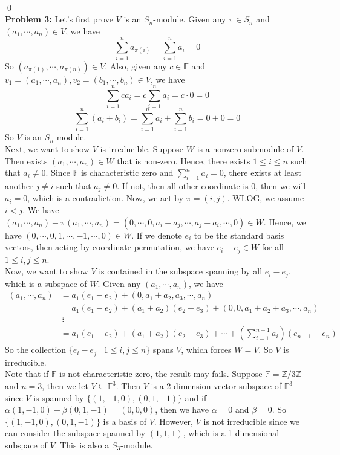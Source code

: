 \documentclass[12pt]{amsart}
\newcommand{\Z}{\mathbb{Z}}
\newcommand{\F}{\mathbb{F}}
\begin{document}
\\\qed\\
\textbf{Problem 3:} Let's first prove $V$ is an $S_n$-module. Given any $\pi\in S_n$ and $(a_1,\cdots, a_n)\in V$, we have 
\[\sum_{i=1}^na_{\pi(i)}=\sum_{i=1}^na_i=0\]
So $(a_{\pi(1)},\cdots, a_{\pi(n)})\in V$. Also, given any $c\in \F$ and $v_1=(a_1,\cdots,a_n),v_2=(b_1,\cdots,b_n)\in V$, we have 
\[\sum_{i=1}^n ca_i=c\sum_{i=1}^na_i=c\cdot 0=0\]
\[\sum_{i=1}^n (a_i+b_i)=\sum_{i=1}^n a_i+\sum_{i=1}^n b_i=0+0=0\]
So $V$ is an $S_n$-module.\\
Next, we want to show $V$ is irreducible. Suppose $W$ is a nonzero submodule of $V$. Then exists $(a_1,\cdots,a_n)\in W$ that is non-zero. Hence, there exists $1\leq i\leq n$ such that $a_i\neq 0$. Since $\F$ is characteristic zero and $\sum_{i=1}^n  a_i=0$, there exists at least another $j\neq i$ such that $a_j\neq 0$. If not, then all other coordinate is 0, then we will $a_i=0$, which is a contradiction. Now, we act by $\pi=(i,j)$. WLOG, we assume $i<j$. We have $(a_1,\cdots, a_n)-\pi (a_1,\cdots, a_n)=(0,\cdots,0,a_i-a_j,\cdots,a_j-a_i,\cdots,0)\in W$. Hence, we have $(0,\cdots, 0,1,\cdots,-1,\cdots,0)\in W$. If we denote $e_i$ to be the standard basis vectors, then acting by coordinate permutation, we have $e_i-e_j\in W$ for all $1\leq i,j\leq n$.\\
Now, we want to show $V$ is contained in the subspace spanning by all $e_i-e_j$, which is a subspace of $W$.
Given any $(a_1,\cdots, a_n)$, we have 
\begin{align*}
    (a_1,\cdots, a_n)
    &=a_1(e_1-e_2)+(0,a_1+a_2,a_3,\cdots, a_n)\\
    &=a_1(e_1-e_2)+(a_1+a_2)(e_2-e_3)+(0,0,a_1+a_2+a_3,\cdots, a_n)\\
    &\ \vdots\\
    &=a_1(e_1-e_2)+(a_1+a_2)(e_2-e_3)+\cdots+ (\sum_{i=1}^{n-1}a_i)(e_{n-1}-e_n)
\end{align*}
So the collection $\{e_i-e_j\mid 1\leq i,j\leq n\}$ spans $V$, which forces $W=V$. So $V$ is irreducible.\\
Note that if $\F$ is not characteristic zero, the result may fails. Suppose $\F=\Z/3\Z$ and $n=3$, then we let $V\subseteq \F^3$. Then $V$ is a 2-dimension vector subspace of $\F^3$ since $V$ is spanned by $\{(1,-1,0),(0,1,-1)\}$ and if $\alpha(1,-1,0)+\beta(0,1,-1)=(0,0,0)$, then we have $\alpha=0$ and $\beta=0$. So $\{(1,-1,0),(0,1,-1)\}$ is a basis of $V$. However, $V$ is not irreducible since we can consider the subspace spanned by $(1,1,1)$, which is a 1-dimensional subspace of $V$. This is also a $S_3$-module. 
\end{document}
